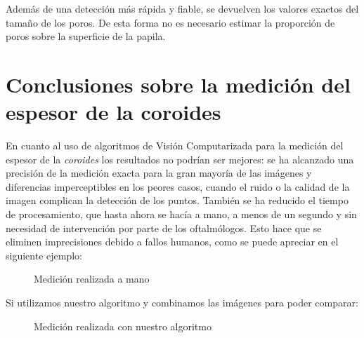 Además de una detección más rápida y fiable, se devuelven los valores exactos del
tamaño de los poros. De esta forma no es necesario estimar la proporción de poros
sobre la superficie de la papila.

\section{Conclusiones sobre la medición del espesor de la coroides}
En cuanto al uso de algoritmos de Visión Computarizada para la 
medición del espesor de la \emph{coroides} los resultados no
podrían ser mejores: se ha alcanzado una precisión de la medición
exacta para la gran mayoría de las imágenes y diferencias 
imperceptibles en los peores casos, cuando el ruido o la calidad
de la imagen complican la detección de los puntos. También se
ha reducido el tiempo de procesamiento, que hasta ahora se hacía
a mano, a menos de un segundo y sin necesidad de intervención
por parte de los oftalmólogos. Esto hace que se eliminen imprecisiones
debido a fallos humanos, como se puede apreciar en el siguiente ejemplo:

    \begin{figure}[H]
      \caption{Medición realizada a mano}
      \centering \setlength\fboxsep{0pt} \setlength\fboxrule{0.5pt}
    \end{figure}

Si utilizamos nuestro algoritmo y combinamos las imágenes para poder
comparar:

    \begin{figure}[H]
      \caption{Medición realizada con nuestro algoritmo}
      \centering \setlength\fboxsep{0pt} \setlength\fboxrule{0.5pt}
    \end{figure}

